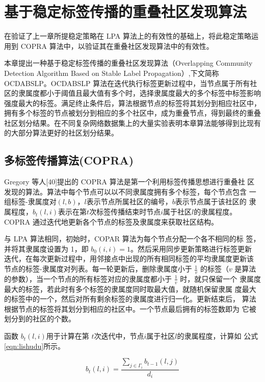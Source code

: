 \chapter{基于稳定标签传播的重叠社区发现算法}
在验证了上一章所提稳定策略在 LPA 算法上的有效性的基础上，将此稳定策略运用到 COPRA 算法中，以验证其在重叠社区发现算法中的有效性。

本章提出一种基于稳定标签传播的重叠社区发现算法（Overlapping Community Detection Algorithm Based on Stable Label Propagation）,下文简称 OCDABSLP。OCDABSLP 算法在迭代执行标签更新过程中，当节点属于所有社区的隶属度都小于阈值且最大值有多个时，选择隶属度最大的多个标签中标签影响强度最大的标签。满足终止条件后，算法根据节点的标签将其划分到相应社区中，拥有多个标签的节点被划分到相应的多个社区中，成为重叠节点，得到最终的重叠社区划分结果。在不同复杂网络数据集上的大量实验表明本章算法能够得到比现有的大部分算法更好的社区划分结果。

\section{多标签传播算法(COPRA)}

Gregory 等人[40]提出的 COPRA 算法是第一个利用标签传播思想进行重叠社
区发现的算法。算法中每个节点可以以不同隶属度拥有多个标签，每个节点包含
一组标签-隶属度对$(l, b)$，$l $表示节点所属社区的编号，$b $表示节点属于该社区的
隶属程度，$b_t(l, i)$表示在第$ t $次标签传播结束时节点$ i $属于社区$ l $的隶属程度。
COPRA 通过迭代地更新各个节点的标签及隶属度来获取社区结构。

与 LPA 算法相同，初始时，COPAR 算法为每个节点分配一个各不相同的标
签，并将其隶属度设置为 1，即 $b_0(i, i) = 1$。然后采用同步更新策略进行标签更新
迭代，在每次更新过程中，用邻接点中出现的所有相同标签的平均隶属度更新该
节点的标签-隶属度对列表。每一轮更新后，删除隶属度小于 $\frac{1}{v}$ 的标签（$v$ 是算法的参数），当一个节点的所有标签对应的隶属度都小于 $\frac{1}{v}$ 时，就只保留一个
隶属度最大的标签，若此时有多个标签的隶属度同时取最大值，就随机保留隶属
度最大的标签中的一个，然后对所有剩余标签的隶属度进行归一化。更新结束后，
算法根据节点的标签将其划分到相应的社区中。一个节点最后拥有的标签数即为
它被划分到的社区的个数。 

函数 $b_t(l, i)$用于计算在第 $t $次迭代中，节点$ i $属于社区$ l $的隶属程度，计算如
公式\ref{eqn:lishudu}所示。

\begin{equation}
  \label{eqn:lishudu}
  b_t(l,i)=\frac{\sum_{j\in \Gamma_i }b_{t-1}(l,j)}{d_i}
\end{equation}

